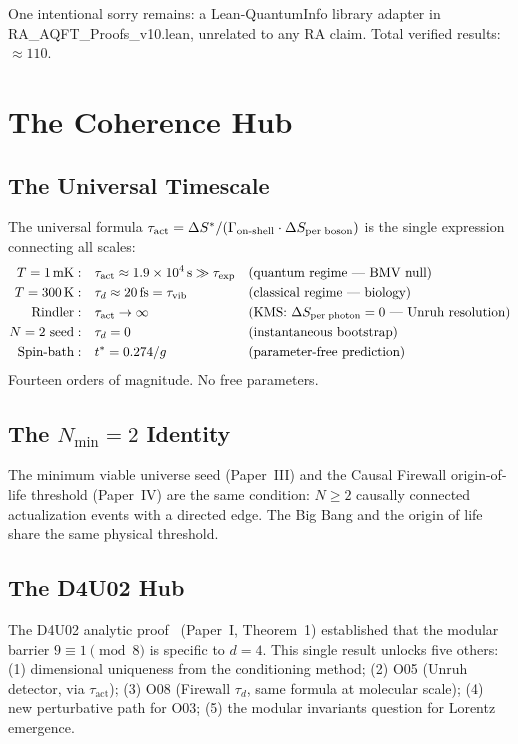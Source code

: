\documentclass[12pt,a4paper]{article}
\begin{document}
One intentional sorry remains: a Lean-QuantumInfo library adapter in RA\_AQFT\_Proofs\_v10.lean, unrelated to any RA claim.  Total verified results: $\approx110$.

\section{The Coherence Hub}\label{sec:hub}

\subsection{The Universal Timescale}

The universal formula $\tau_{\mathrm{act}} = \Delta S^*/(\Gamma_{\mathrm{on\text{-}shell}}\cdot\Delta S_{\mathrm{per\;boson}})$ is the single expression connecting all scales:
\begin{align}
  T=1\,\mathrm{mK}: &\quad \tau_{\mathrm{act}} \approx 1.9\times10^4\,\mathrm{s} \gg \tau_{\mathrm{exp}} &&\text{(quantum regime — BMV null)} \\
  T=300\,\mathrm{K}: &\quad \tau_d \approx 20\,\mathrm{fs} = \tau_{\mathrm{vib}} &&\text{(classical regime — biology)} \\
  \text{Rindler}: &\quad \tau_{\mathrm{act}} \to \infty &&\text{(KMS: $\Delta S_{\mathrm{per\;photon}}=0$ --- Unruh resolution)} \\
  N=2\text{ seed}: &\quad \tau_d = 0 &&\text{(instantaneous bootstrap)} \\
  \text{Spin-bath}: &\quad t^* = 0.274/g &&\text{(parameter-free prediction)}
\end{align}
Fourteen orders of magnitude.  No free parameters.

\subsection{The $N_{\min}=2$ Identity}

The minimum viable universe seed (Paper~III) and the Causal Firewall origin-of-life threshold (Paper~IV) are the same condition: $N\geq 2$ causally connected actualization events with a directed edge.  The Big Bang and the origin of life share the same physical threshold.

\subsection{The D4U02 Hub}

The D4U02 analytic proof \statusDR\ (Paper~I, Theorem~1) established that the modular barrier $9\equiv 1\pmod{8}$ is specific to $d=4$.  This single result unlocks five others: (1) dimensional uniqueness from the conditioning method; (2) O05 (Unruh detector, via $\tau_{\mathrm{act}}$); (3) O08 (Firewall $\tau_d$, same formula at molecular scale); (4) new perturbative path for O03; (5) the modular invariants question for Lorentz emergence.
\end{document}
